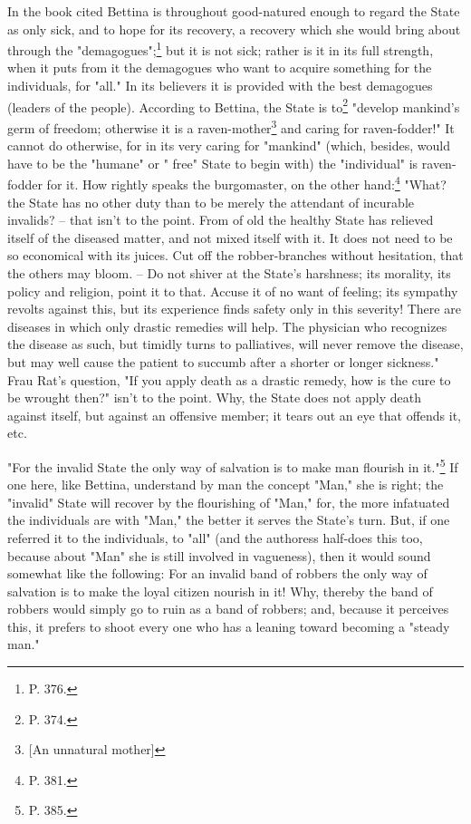 \documentclass[a4paper]{book}
\begin{document}
In the book cited Bettina is throughout good-natured enough to regard the 
State as only sick, and to hope for its recovery, a recovery which she would 
bring about through the "{}demagogues"{};\footnote{P. 376.} but it is not 
sick; rather is it in its full strength, when it puts from it the demagogues 
who want to acquire something for the individuals, for "{}all."{} In its 
believers it is provided with the best demagogues (leaders of the people). 
According to Bettina, the State is to\footnote{P. 374.} "{}develop mankind's 
germ of freedom; otherwise it is a raven-mother\footnote{[An unnatural 
mother]} and caring for raven-fodder!"{} It cannot do otherwise, for in its 
very caring for "{}mankind"{} (which, besides, would have to be the 
"{}humane"{} or "{} free"{} State to begin with) the "{}individual"{} is 
raven-fodder for it. How rightly speaks the burgomaster, on the other 
hand:\footnote{P. 381.} "{}What? the State has no other duty than to be merely 
the attendant of incurable invalids? -- that isn't to the point. From of old 
the healthy State has relieved itself of the diseased matter, and not mixed 
itself with it. It does not need to be so economical with its juices. Cut off 
the robber-branches without hesitation, that the others may bloom. -- Do not 
shiver at the State's harshness; its morality, its policy and religion, point 
it to that. Accuse it of no want of feeling; its sympathy revolts against 
this, but its experience finds safety only in this severity! There are 
diseases in which only drastic remedies will help. The physician who 
recognizes the disease as such, but timidly turns to palliatives, will never 
remove the disease, but may well cause the patient to succumb after a shorter 
or longer sickness."{} Frau Rat's question, "{}If you apply death as a drastic 
remedy, how is the cure to be wrought then?"{} isn't to the point. Why, the 
State does not apply death against itself, but against an offensive member; it 
tears out an eye that offends it, etc.

"{}For the invalid State the only way of salvation is to make man flourish in 
it."{}\footnote{P. 385.} If one here, like Bettina, understand by man the 
concept "{}Man,"{} she is right; the "{}invalid"{} State will recover by the 
flourishing of "{}Man,"{} for, the more infatuated the individuals are with 
"{}Man,"{} the better it serves the State's turn. But, if one referred it to 
the individuals, to "{}all"{} (and the authoress half-does this too, because 
about "{}Man"{} she is still involved in vagueness), then it would sound 
somewhat like the following: For an invalid band of robbers the only way of 
salvation is to make the loyal citizen nourish in it! Why, thereby the band of 
robbers would simply go to ruin as a band of robbers; and, because it 
perceives this, it prefers to shoot every one who has a leaning toward 
becoming a "{}steady man."{}
\end{document}
